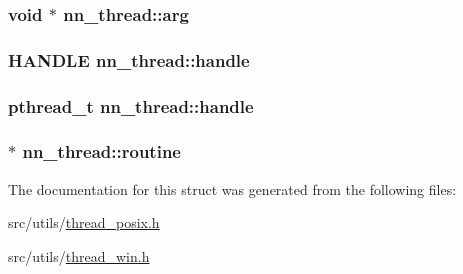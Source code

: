 \subsubsection[{arg}]{\setlength{\rightskip}{0pt plus 5cm}void $\ast$ nn\+\_\+thread\+::arg}\hypertarget{structnn__thread_acdc3ce75ed1be5edd45764f32d929de6}{}\label{structnn__thread_acdc3ce75ed1be5edd45764f32d929de6}
\subsubsection[{handle}]{\setlength{\rightskip}{0pt plus 5cm}H\+A\+N\+D\+LE nn\+\_\+thread\+::handle}\hypertarget{structnn__thread_ab4a5499c56bbf976118c18587f923705}{}\label{structnn__thread_ab4a5499c56bbf976118c18587f923705}
\subsubsection[{handle}]{\setlength{\rightskip}{0pt plus 5cm}pthread\+\_\+t nn\+\_\+thread\+::handle}\hypertarget{structnn__thread_a716d0a3bb39d4fcba65b05cafeb16f44}{}\label{structnn__thread_a716d0a3bb39d4fcba65b05cafeb16f44}
\subsubsection[{routine}]{ $\ast$ nn\+\_\+thread\+::routine}\hypertarget{structnn__thread_a9f262c0e7e21082e8a5cbe2bd3cb2dc6}{}\label{structnn__thread_a9f262c0e7e21082e8a5cbe2bd3cb2dc6}


The documentation for this struct was generated from the following files\+:\begin{DoxyCompactItemize}
\item 
src/utils/\hyperlink{thread__posix_8h}{thread\+\_\+posix.\+h}\item 
src/utils/\hyperlink{thread__win_8h}{thread\+\_\+win.\+h}\end{DoxyCompactItemize}

